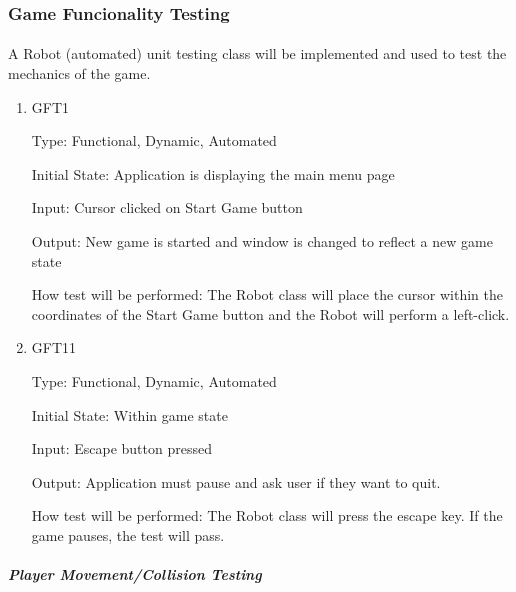 \documentclass[12pt, titlepage]{article}
\begin{document}
\subsubsection{Game Funcionality Testing}
		
\paragraph{}
A Robot (automated) unit testing class will be implemented and used to test the mechanics of the game.

\begin{enumerate}

\item{GFT1\\}

Type: Functional, Dynamic, Automated
					
Initial State: Application is displaying the main menu page
					
Input: Cursor clicked on Start Game button
					
Output: New game is started and window is changed to reflect a new game state
					
How test will be performed: The Robot class will place the cursor within the coordinates of the Start Game button and the Robot will perform a left-click.

\item{GFT11\\}

Type: Functional, Dynamic, Automated
					
Initial State: Within game state
					
Input: Escape button pressed
					
Output: Application must pause and ask user if they want to quit.

How test will be performed: The Robot class will press the escape key. If the game pauses, the test will pass.

\end{enumerate}

\subparagraph{Player Movement/Collision Testing}
\end{document}
